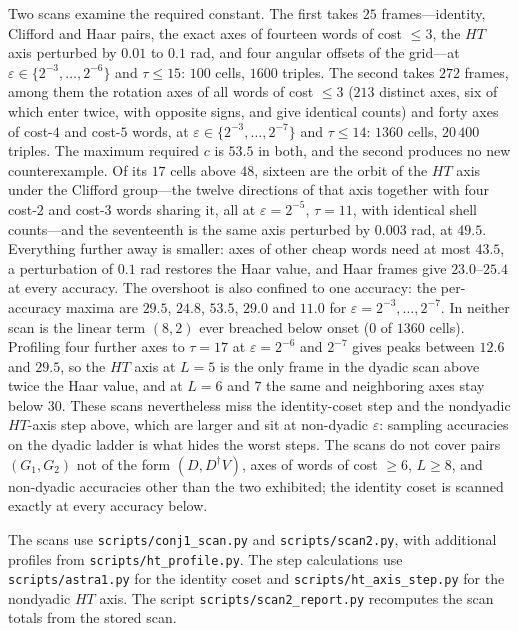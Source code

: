 \documentclass[aps,prx,twocolumn,superscriptaddress,nofootinbib,longbibliography]{revtex4-2}
\theoremstyle{plain}
\theoremstyle{definition}
\theoremstyle{remark}
\begin{document}
Two scans examine the required constant. The first takes $25$ frames---identity, Clifford and Haar pairs, the exact axes of fourteen words of cost $\le3$, the $HT$ axis perturbed by $0.01$ to $0.1$ rad, and four angular offsets of the grid---at $\varepsilon\in\{2^{-3},\dots,2^{-6}\}$ and $\tau\le15$: $100$ cells, $1600$ triples. The second takes $272$ frames, among them the rotation axes of all words of cost $\le3$ ($213$ distinct axes, six of which enter twice, with opposite signs, and give identical counts) and forty axes of cost-$4$ and cost-$5$ words, at $\varepsilon\in\{2^{-3},\dots,2^{-7}\}$ and $\tau\le14$: $1360$ cells, $20\,400$ triples. The maximum required $c$ is $53.5$ in both, and the second produces no new counterexample. Of its $17$ cells above $48$, sixteen are the orbit of the $HT$ axis under the Clifford group---the twelve directions of that axis together with four cost-$2$ and cost-$3$ words sharing it, all at $\varepsilon=2^{-5}$, $\tau=11$, with identical shell counts---and the seventeenth is the same axis perturbed by $0.003$ rad, at $49.5$. Everything further away is smaller: axes of other cheap words need at most $43.5$, a perturbation of $0.1$ rad restores the Haar value, and Haar frames give $23.0$--$25.4$ at every accuracy. The overshoot is also confined to one accuracy: the per-accuracy maxima are $29.5$, $24.8$, $\mathbf{53.5}$, $29.0$ and $11.0$ for $\varepsilon=2^{-3},\dots,2^{-7}$. In neither scan is the linear term $(8,2)$ ever breached below onset ($0$ of $1360$ cells). Profiling four further axes to $\tau=17$ at $\varepsilon=2^{-6}$ and $2^{-7}$ gives peaks between $12.6$ and $29.5$, so the $HT$ axis at $L=5$ is the only frame in the dyadic scan above twice the Haar value, and at $L=6$ and $7$ the same and neighboring axes stay below $30$. These scans nevertheless miss the identity-coset step and the nondyadic $HT$-axis step above, which are larger and sit at non-dyadic $\varepsilon$: sampling accuracies on the dyadic ladder is what hides the worst steps. The scans do not cover pairs $(G_1,G_2)$ not of the form $(D,D^\dagger V)$, axes of words of cost $\ge6$, $L\ge8$, and non-dyadic accuracies other than the two exhibited; the identity coset is scanned exactly at every accuracy below. 

The scans use \texttt{scripts/conj1\_scan.py} and \texttt{scripts/scan2.py}, with additional profiles from \texttt{scripts/ht\_profile.py}. The step calculations use \texttt{scripts/astra1.py} for the identity coset and \texttt{scripts/ht\_axis\_step.py} for the nondyadic $HT$ axis. The script \texttt{scripts/scan2\_report.py} recomputes the scan totals from the stored scan.
\end{document}
